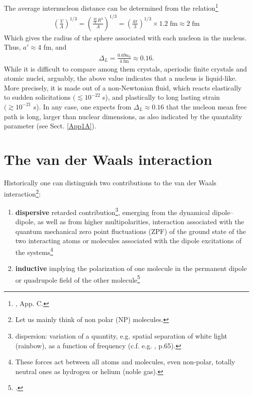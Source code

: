 \begin{subappendices}
The average internucleon distance can be determined from the relation\footnote{\cite{Brink:05}, App. C.}
\begin{align}
\left(\frac{V}{A}\right)^{1/3}=\left(\frac{\frac{4\pi}{3}R^3}{A}\right)^{1/3}=\left(\frac{4\pi}{3}\right)^{1/3}\times 1.2\; \text{fm}\approx 2\;\text{fm}
\end{align} 
Which gives the radius of the sphere associated with each nucleon in the nucleus. Thus, $a'\approx4$ fm, and 
\begin{align}
\Delta_L=\frac{0.69 a_0}{4\;\text{fm}}\approx0.16.
\end{align} 
While it is difficult to compare among them crystals, aperiodic finite crystals and atomic nuclei, arguably, the above value indicates that a nucleus is liquid-like. More precisely, it is made out of a non-Newtonian fluid, which reacts elastically to sudden so\-li\-ci\-ta\-tions $(\lesssim 10^{-22}$ s),  and plastically to long lasting strain $(\gtrsim 10^{-21}$ s). In any case, one expects from $\Delta_L\approx 0.16$ that the nucleon mean free path is long, larger than nuclear dimensions, as also indicated by the quantality parameter (see Sect. \ref{App1A}). 

\section{The van der Waals interaction}\label{C2AppD}
Historically one can distinguish two contributions to the van der Waals interaction\footnote{Let us mainly think of non polar (NP) molecules.}: 
\begin{enumerate}
\item \textbf{dispersive} retarded contribution\footnote{dispersion: variation of a quantity, e.g. spatial separation of white light (rainbow), as a function of frequency (c.f. e.g. \cite{Israelachvili:85}, p.65).}, emerging from the dynamical dipole--dipole, as well as from higher multipolarities, interaction associated with the quantum mechanical zero point fluctuations (ZPF) of the ground state of the two interacting atoms or molecules associated with the dipole excitations of the systems\footnote{These forces act between all atoms and molecules, even non-polar, totally neutral ones as hydrogen or helium (noble gas).} 
\item \textbf{inductive} implying the polarization of one molecule in the permanent dipole or quadrupole field of the other molecule\footnote{\cite{Debye:20,Debye:21}.} 
\end{enumerate}


\end{subappendices}
